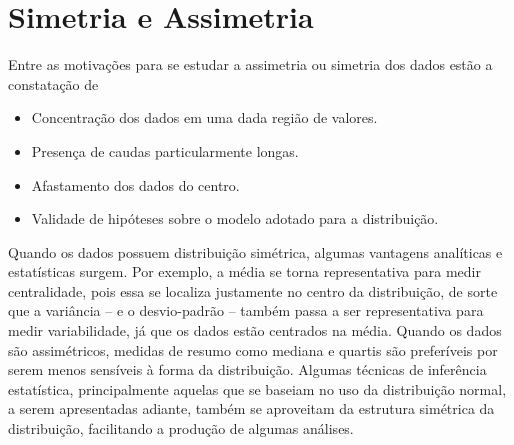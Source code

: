 \section{Simetria e Assimetria}

Entre as motivações para se estudar a assimetria ou simetria dos dados estão a constatação
de
\begin{itemize}
\item Concentração dos dados em uma dada região de valores.
\item Presença de caudas particularmente longas.
\item Afastamento dos dados do centro.
\item Validade de hipóteses sobre o modelo adotado para a distribuição.
\end{itemize}

Quando os dados possuem distribuição simétrica, algumas vantagens analíticas e estatísticas
surgem.
Por exemplo, a média se torna representativa para medir centralidade, pois essa se localiza
justamente no centro da distribuição, de sorte que a variância -- e o desvio-padrão --
também passa a ser representativa para medir variabilidade, já que os dados estão
centrados na média.
Quando os dados são assimétricos, medidas de resumo como mediana e quartis são preferíveis
por serem menos sensíveis à forma da distribuição.
Algumas técnicas de inferência estatística, principalmente aquelas que se baseiam no uso
da distribuição normal, a serem apresentadas adiante, também se aproveitam da estrutura
simétrica da distribuição, facilitando a produção de algumas análises.

